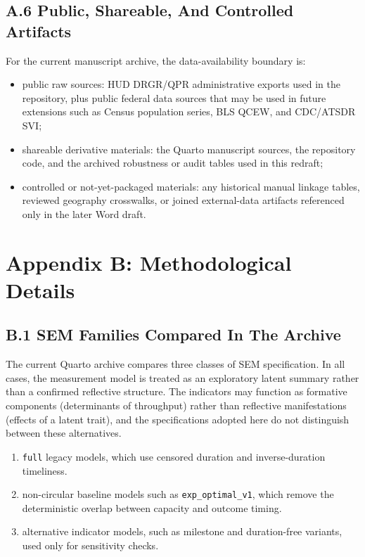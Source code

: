 \documentclass[
  letterpaper,
]{article}
\providecommand{\tightlist}{%
  \setlength{\itemsep}{0pt}\setlength{\parskip}{0pt}}
\begin{document}
\subsection{A.6 Public, Shareable, And Controlled
Artifacts}\label{a.6-public-shareable-and-controlled-artifacts}

For the current manuscript archive, the data-availability boundary is:

\begin{itemize}
\tightlist
\item
  public raw sources: HUD DRGR/QPR administrative exports used in the
  repository, plus public federal data sources that may be used in
  future extensions such as Census population series, BLS QCEW, and
  CDC/ATSDR SVI;
\item
  shareable derivative materials: the Quarto manuscript sources, the
  repository code, and the archived robustness or audit tables used in
  this redraft;
\item
  controlled or not-yet-packaged materials: any historical manual
  linkage tables, reviewed geography crosswalks, or joined external-data
  artifacts referenced only in the later Word draft.
\end{itemize}

\newpage

\section*{Appendix B: Methodological
Details}\label{appendix-b-methodological-details}

\subsection{B.1 SEM Families Compared In The
Archive}\label{b.1-sem-families-compared-in-the-archive}

The current Quarto archive compares three classes of SEM specification.
In all cases, the measurement model is treated as an exploratory latent
summary rather than a confirmed reflective structure. The indicators may
function as formative components (determinants of throughput) rather
than reflective manifestations (effects of a latent trait), and the
specifications adopted here do not distinguish between these
alternatives.

\begin{enumerate}
\def\labelenumi{\arabic{enumi}.}
\tightlist
\item
  \texttt{full} legacy models, which use censored duration and
  inverse-duration timeliness.
\item
  non-circular baseline models such as \texttt{exp\_optimal\_v1}, which
  remove the deterministic overlap between capacity and outcome timing.
\item
  alternative indicator models, such as milestone and duration-free
  variants, used only for sensitivity checks.
\end{enumerate}
\end{document}
